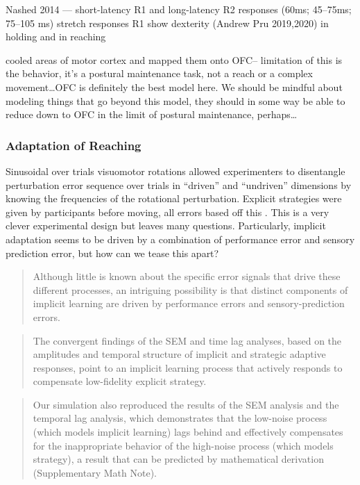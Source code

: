 \documentclass[../main.tex]{subfiles}
\begin{document}
Nashed 2014 --- short-latency R1 and long-latency R2 responses (60ms; 45--75ms; 75--105 ms) stretch responses R1 show dexterity (Andrew Pru 2019,2020) in holding and in reaching

\cite{@takeiTransientDeactivationDorsal2021} cooled areas of motor cortex and mapped them onto OFC-- limitation of this is the behavior, it's a postural maintenance task, not a reach or a complex movement\ldots OFC is definitely the best model here. We should be mindful about modeling things that go beyond this model, they should in some way be able to reduce down to OFC in the limit of postural maintenance, perhaps\ldots{}

\subsubsection{Adaptation of Reaching}\label{adaptation-of-reaching}

Sinusoidal over trials visuomotor rotations allowed experimenters to disentangle perturbation error sequence over trials in ``driven'' and ``undriven'' dimensions by knowing the frequencies of the rotational perturbation. Explicit strategies were given by participants before moving, all errors based off this \cite{@miyamotoImplicitAdaptationCompensates2020}. This is a very clever experimental design but leaves many questions. Particularly, implicit adaptation seems to be driven by a combination of performance error and sensory prediction error, but how can we tease this apart?

\begin{quote}
Although little is known about the specific error signals that drive these different processes, an intriguing possibility is that distinct components of implicit learning are driven by performance errors and sensory-prediction errors.
\end{quote}

\begin{quote}
The convergent findings of the SEM and time lag analyses, based on the amplitudes and temporal structure of implicit and strategic adaptive responses, point to an implicit learning process that actively responds to compensate low-fidelity explicit strategy.
\end{quote}

\begin{quote}
Our simulation also reproduced the results of the SEM analysis and the temporal lag analysis, which demonstrates that the low-noise process (which models implicit learning) lags behind and effectively compensates for the inappropriate behavior of the high-noise process (which models strategy), a result that can be predicted by mathematical derivation (Supplementary Math Note).
\end{quote}
\end{document}
